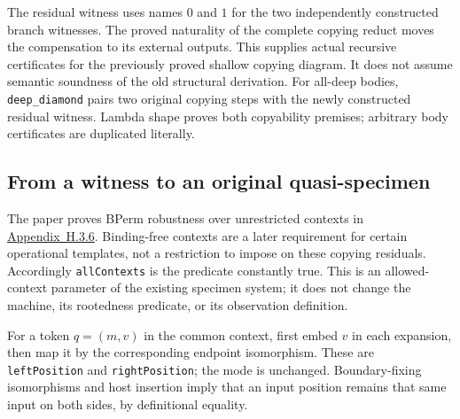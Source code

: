 
The residual witness uses names $0$ and $1$ for the two independently constructed
branch witnesses. The proved naturality of the complete copying reduct moves
the compensation to its external outputs. This supplies actual recursive
certificates for the previously proved shallow copying diagram. It does not
assume semantic soundness of the old structural derivation.
For all-deep bodies, \texttt{deep\_diamond} pairs two original copying steps
with the newly constructed residual witness. Lambda shape proves both
copyability premises; arbitrary body certificates are duplicated literally.


\subsection{From a witness to an original quasi-specimen}
The paper proves BPerm robustness over unrestricted contexts in
\href{https://arxiv.org/html/1907.01257v5\#A8.SS3.SSS6}{Appendix~H.3.6}.
Binding-free contexts are a later requirement for certain operational templates,
not a restriction to impose on these copying residuals. Accordingly
\texttt{allContexts} is the predicate constantly true. This is an allowed-context
parameter of the existing specimen system; it does not change the machine,
its rootedness predicate, or its observation definition.


For a token $q=(m,v)$ in the common context, first embed $v$ in each expansion,
then map it by the corresponding endpoint isomorphism. These are
\texttt{leftPosition} and \texttt{rightPosition}; the mode is unchanged.
Boundary-fixing isomorphisms and host insertion imply that an input position
remains that same input on both sides, by definitional equality.


